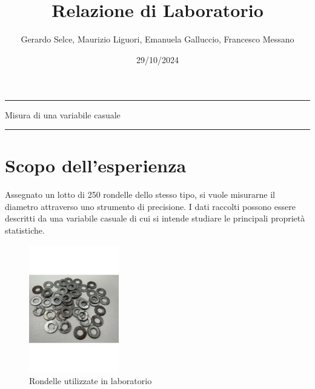 \documentclass[11pt]{article}
\begin{document}
\setlength{\parindent}{0pt}
\title{\vspace{-4em}{\large Laboratorio di Meccanica e Termodinamica} \\
    Relazione di Laboratorio}
\author{Gerardo Selce, Maurizio Liguori, Emanuela Galluccio, Francesco Messano}
\date{29/10/2024}
\maketitle

\vspace{-2em}\par\noindent\rule{\textwidth}{0.4pt}
\begin{center}
    {\Large\sc Misura di una variabile casuale} 
\end{center}
\par\noindent\rule{\textwidth}{0.4pt}

\section{Scopo dell'esperienza}
Assegnato un lotto di 250 rondelle dello stesso tipo, si vuole misurarne il diametro attraverso uno strumento di precisione. I dati raccolti possono essere descritti da una variabile casuale di cui si intende studiare le principali proprietà statistiche.

\begin{figure}[ht]
  \centering
  \includegraphics[width=0.35\textwidth]{Immagine WhatsApp 2024-11-01 ore 17.29.35_0368a3ac.pdf}
  \caption{Rondelle utilizzate in laboratorio}
\end{figure}
\end{document}
